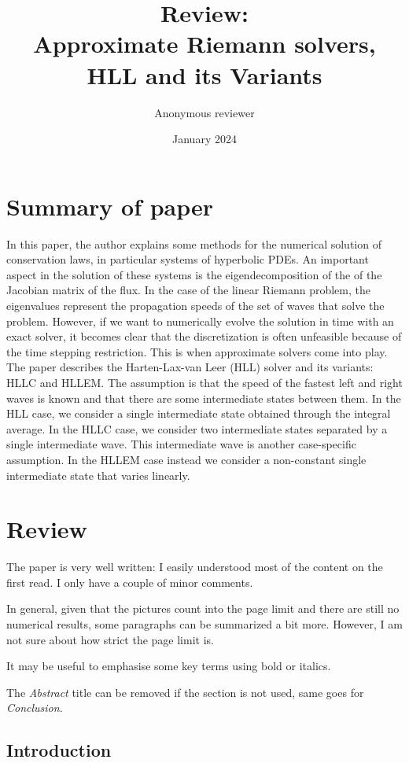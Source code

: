 \documentclass{scrartcl}
\title{Review: \\Approximate Riemann solvers, HLL and its Variants}
\author{Anonymous reviewer} %
\date{January 2024}
\begin{document}
\maketitle

\section{Summary of paper}

In this paper, the author explains some methods for the numerical solution of conservation laws, in particular systems of hyperbolic PDEs. An important aspect in the solution of these systems is the eigendecomposition of the of the Jacobian matrix of the flux. In the case of the linear Riemann problem, the eigenvalues represent the propagation speeds of the set of waves that solve the problem. However, if we want to numerically evolve the solution in time with an exact solver, it becomes clear that the discretization is often unfeasible because of the time stepping restriction. This is when approximate solvers come into play. The paper describes the Harten-Lax-van Leer (HLL) solver and its variants: HLLC and HLLEM. The assumption is that the speed of the fastest left and right waves is known and that there are some intermediate states between them. In the HLL case, we consider a single intermediate state obtained through the integral average. In the HLLC case, we consider two intermediate states separated by a single intermediate wave. This intermediate wave is another case-specific assumption. In the HLLEM case instead we consider a non-constant single intermediate state that varies linearly.

\section{Review}

The paper is very well written: I easily understood most of the content on the first read. I only have a couple of minor comments.

In general, given that the pictures count into the page limit and there are still no numerical results, some paragraphs can be summarized a bit more. However, I am not sure about how strict the page limit is.

It may be useful to emphasise some key terms using bold or italics.

The \textit{Abstract} title can be removed if the section is not used, same goes for \textit{Conclusion}.

\subsection{Introduction}
\end{document}
